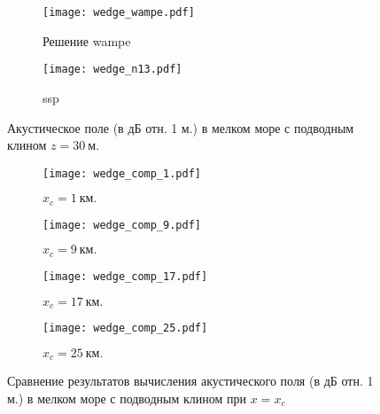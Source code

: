 \documentclass[../document.tex]{subfiles}
\begin{document}
                \begin{figure}[h]
                    \centering
                    \begin{subfigure}[t]{0.49\textwidth}
                        \centering
                        \texttt{[image: wedge\_wampe.pdf]}
                        \caption{Решение \acrshort{wampe}}
                    \end{subfigure}
                    \begin{subfigure}[t]{0.49\textwidth}
                        \centering
                        \texttt{[image: wedge\_n13.pdf]}
                        \caption{\acrshort{ssp}}
                    \end{subfigure}
                    \hfill
                    \caption{Акустическое поле (в дБ отн. 1 м.) в мелком море с подводным клином $z=30\ \text{м.}$\label{fig::wedge_field}}
                \end{figure}
                \begin{figure}[h]
                    \centering
                    \begin{subfigure}[t]{0.9\textwidth}
                        \centering
                        \texttt{[image: wedge\_comp\_1.pdf]}
                        \caption{$x_c=1\ \text{км.}$}
                    \end{subfigure}
                    \hfill
                    \begin{subfigure}[t]{0.9\textwidth}
                        \centering
                        \texttt{[image: wedge\_comp\_9.pdf]}
                        \caption{$x_c=9\ \text{км.}$}
                    \end{subfigure}
                    \hfill
                    \begin{subfigure}[t]{0.9\textwidth}
                        \centering
                        \texttt{[image: wedge\_comp\_17.pdf]}
                        \caption{$x_c=17\ \text{км.}$}
                    \end{subfigure}
                    \hfill
                    \begin{subfigure}[t]{0.9\textwidth}
                        \centering
                        \texttt{[image: wedge\_comp\_25.pdf]}
                        \caption{$x_c=25\ \text{км.}$}
                    \end{subfigure}
                    \caption{Сравнение результатов вычисления акустического поля (в дБ отн. 1 м.) в мелком море с подводным клином при $x=x_c$\label{fig::wedge_comp}}
                \end{figure}
\end{document}
